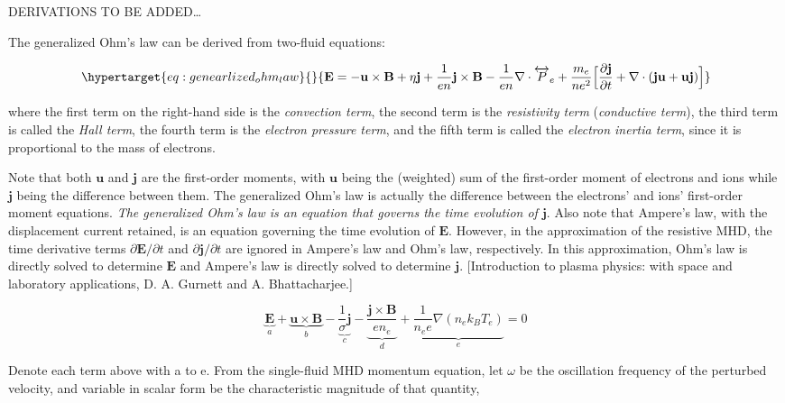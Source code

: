 \documentclass[
  notoc %
]{tufte-book}
\begin{document}
DERIVATIONS TO BE ADDED\ldots{}

The generalized Ohm's law can be derived from two-fluid equations:

\begin{equation}\protect\hypertarget{eq:genearlized_ohm_law}{}{
\mathbf{E} = -\mathbf{u}\times\mathbf{B} + \eta\mathbf{j} + \frac{1}{en}\mathbf{j}\times\mathbf{B}-\frac{1}{en}\nabla\cdot\overleftrightarrow{P}_e +\frac{m_e}{ne^2}\Big[ \frac{\partial \mathbf{j}}{\partial t}+\nabla\cdot(\mathbf{j}\mathbf{u}+\mathbf{u}\mathbf{j}) \Big]
}\label{eq:genearlized_ohm_law}\end{equation}

where the first term on the right-hand side is the \emph{convection
term}, the second term is the \emph{resistivity term} (\emph{conductive
term}), the third term is called the \emph{Hall term}, the fourth term
is the \emph{electron pressure term}, and the fifth term is called the
\emph{electron inertia term}, since it is proportional to the mass of
electrons.

Note that both \(\mathbf{u}\) and \(\mathbf{j}\) are the first-order
moments, with \(\mathbf{u}\) being the (weighted) sum of the first-order
moment of electrons and ions while \(\mathbf{j}\) being the difference
between them. The generalized Ohm's law is actually the difference
between the electrons' and ions' first-order moment equations. \emph{The
generalized Ohm's law is an equation that governs the time evolution of
\(\mathbf{j}\)}. Also note that Ampere's law, with the displacement
current retained, is an equation governing the time evolution of
\(\mathbf{E}\). However, in the approximation of the resistive MHD, the
time derivative terms \(\partial \mathbf{E}/\partial t\) and
\(\partial \mathbf{j} /\partial t\) are ignored in Ampere's law and
Ohm's law, respectively. In this approximation, Ohm's law is directly
solved to determine \(\mathbf{E}\) and Ampere's law is directly solved
to determine \(\mathbf{j}\). {[}Introduction to plasma physics: with
space and laboratory applications, D. A. Gurnett and A.
Bhattacharjee.{]}

\[
\underbrace{\mathbf{E}}_{a} + \underbrace{\mathbf{u}\times\mathbf{B}}_{b} - \underbrace{\frac{1}{\sigma}\mathbf{j}}_{c} - \underbrace{\frac{\mathbf{j}\times\mathbf{B}}{en_e}}_{d} + \underbrace{\frac{1}{n_e e}\nabla(n_e k_B T_e)}_{e} = 0
\]

Denote each term above with a to e. From the single-fluid MHD momentum
equation, let \(\omega\) be the oscillation frequency of the perturbed
velocity, and variable in scalar form be the characteristic magnitude of
that quantity,
\end{document}

